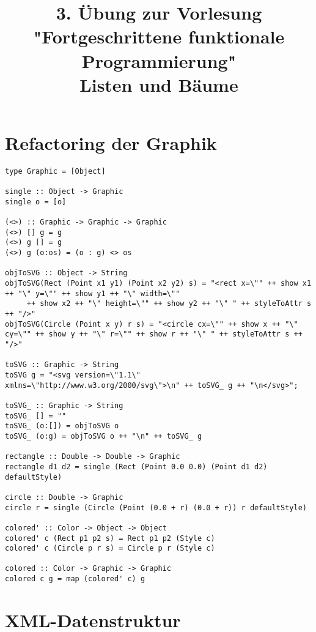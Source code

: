 \documentclass[a4paper]{article}
\title{\small{3. Übung zur Vorlesung "Fortgeschrittene funktionale Programmierung"}\\\vspace{.5cm}\huge{Listen und Bäume}}
\begin{document}
\maketitle

\section{Refactoring der Graphik}

\begin{lstlisting}
type Graphic = [Object]

single :: Object -> Graphic
single o = [o]

(<>) :: Graphic -> Graphic -> Graphic
(<>) [] g = g
(<>) g [] = g
(<>) g (o:os) = (o : g) <> os

objToSVG :: Object -> String
objToSVG(Rect (Point x1 y1) (Point x2 y2) s) = "<rect x=\"" ++ show x1 ++ "\" y=\"" ++ show y1 ++ "\" width=\""
     ++ show x2 ++ "\" height=\"" ++ show y2 ++ "\" " ++ styleToAttr s ++ "/>" 
objToSVG(Circle (Point x y) r s) = "<circle cx=\"" ++ show x ++ "\" cy=\"" ++ show y ++ "\" r=\"" ++ show r ++ "\" " ++ styleToAttr s ++ "/>"

toSVG :: Graphic -> String
toSVG g = "<svg version=\"1.1\" xmlns=\"http://www.w3.org/2000/svg\">\n" ++ toSVG_ g ++ "\n</svg>"; 

toSVG_ :: Graphic -> String
toSVG_ [] = ""
toSVG_ (o:[]) = objToSVG o
toSVG_ (o:g) = objToSVG o ++ "\n" ++ toSVG_ g  

rectangle :: Double -> Double -> Graphic
rectangle d1 d2 = single (Rect (Point 0.0 0.0) (Point d1 d2) defaultStyle)

circle :: Double -> Graphic
circle r = single (Circle (Point (0.0 + r) (0.0 + r)) r defaultStyle)

colored' :: Color -> Object -> Object
colored' c (Rect p1 p2 s) = Rect p1 p2 (Style c)
colored' c (Circle p r s) = Circle p r (Style c)

colored :: Color -> Graphic -> Graphic
colored c g = map (colored' c) g
\end{lstlisting}

\pagebreak

\section{XML-Datenstruktur}
\end{document}
